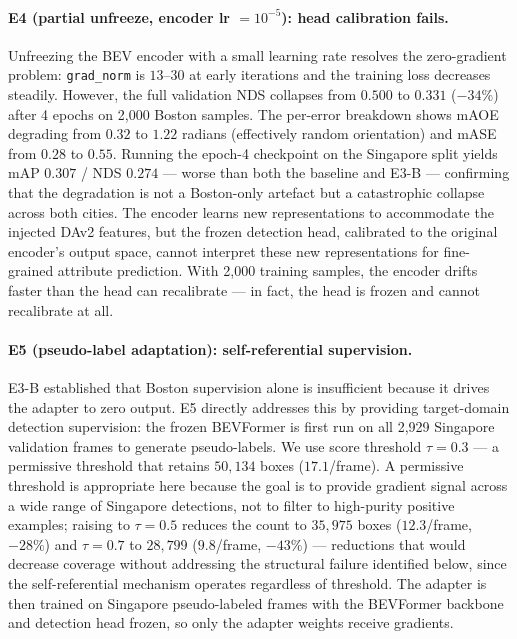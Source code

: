 \documentclass[letterpaper, 10pt, journal]{IEEEtran}
\begin{document}
\paragraph{E4 (partial unfreeze, encoder lr $= 10^{-5}$): head calibration fails.}
Unfreezing the BEV encoder with a small learning rate resolves the zero-gradient
problem: \texttt{grad\_norm} is $13$--$30$ at early iterations and the training loss
decreases steadily.
However, the full validation NDS collapses from $0.500$ to $0.331$ ($-34\%$) after
4 epochs on 2{,}000 Boston samples.
The per-error breakdown shows mAOE degrading from $0.32$ to $1.22$ radians (effectively
random orientation) and mASE from $0.28$ to $0.55$.
Running the epoch-4 checkpoint on the Singapore split yields mAP $0.307$ / NDS $0.274$
--- worse than both the baseline and E3-B --- confirming that the degradation is
not a Boston-only artefact but a catastrophic collapse across both cities.
The encoder learns new representations to accommodate the injected DAv2 features,
but the frozen detection head, calibrated to the original encoder's output space,
cannot interpret these new representations for fine-grained attribute prediction.
With 2{,}000 training samples, the encoder drifts faster than the head can recalibrate
--- in fact, the head is frozen and cannot recalibrate at all.

\paragraph{E5 (pseudo-label adaptation): self-referential supervision.}
E3-B established that Boston supervision alone is insufficient because it drives the
adapter to zero output.
E5 directly addresses this by providing target-domain detection supervision:
the frozen BEVFormer is first run on all 2{,}929 Singapore validation frames to
generate pseudo-labels.
We use score threshold $\tau = 0.3$ --- a permissive threshold that retains
$50{,}134$ boxes ($17.1$/frame).
A permissive threshold is appropriate here because the goal is to provide gradient
signal across a wide range of Singapore detections, not to filter to high-purity
positive examples; raising to $\tau = 0.5$ reduces the count to $35{,}975$ boxes
($12.3$/frame, $-28\%$) and $\tau = 0.7$ to $28{,}799$ ($9.8$/frame, $-43\%$)
--- reductions that would decrease coverage without addressing the structural failure
identified below, since the self-referential mechanism operates regardless of threshold.
The adapter is then trained on Singapore pseudo-labeled frames with the BEVFormer
backbone and detection head frozen, so only the adapter weights receive gradients.
\end{document}

